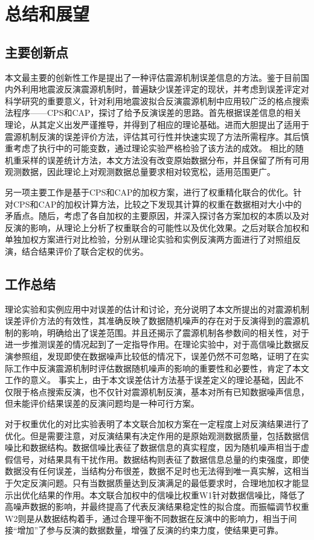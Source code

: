 

\chapter{总结和展望}
\section{主要创新点}
本文最主要的创新性工作是提出了一种评估震源机制误差信息的方法。鉴于目前国内外利用地震波反演震源机制时，普遍缺少误差评定的现状，并考虑到误差评定对科学研究的重要意义，针对利用地震波拟合反演震源机制中应用较广泛的格点搜索法程序——CPS和CAP，探讨了给予反演误差的思路。首先根据误差信息的相关理论，从其定义出发严谨推导，并得到了相应的理论基础。进而大胆提出了适用于震源机制反演的误差评价方法，评估其可行性并快速实现了方法所需程序。其后慎重考虑了执行中的可能变数，通过理论实验严格检验了该方法的成效。
相比的随机重采样的误差统计方法，本文方法没有改变原始数据分布，并且保留了所有可用观测数据，因此理论上对观测数据总量要求相对较宽松，适用范围更广。

另一项主要工作是基于CPS和CAP的加权方案，进行了权重精化联合的优化。针对CPS和CAP的加权计算方法，比较之下发现其计算的权重在数据相对大小中的矛盾点。随后，考虑了各自加权的主要原因，并深入探讨各方案加权的本质以及对反演的影响，从理论上分析了权重联合的可能性以及优化效果。之后对联合加权和单独加权方案进行对比检验，分别从理论实验和实例反演两方面进行了对照组反演，结合结果评价了联合定权的优劣。
\section{工作总结}
理论实验和实例应用中对误差的估计和讨论，充分说明了本文所提出的对震源机制误差评价方法的有效性，其准确反映了数据随机噪声的存在对于反演得到的震源机制的影响，明确给出了误差范围。并且还揭示了震源机制各参数间的相关性，对于进一步推测误差的情况起到了一定指导作用。在理论实验中，对于高信噪比数据反演参照组，发现即使在数据噪声比较低的情况下，误差仍然不可忽略，证明了在实际工作中反演震源机制时评估数据随机噪声的影响的重要性和必要性，肯定了本文工作的意义。
事实上，由于本文误差估计方法基于误差定义的理论基础，因此不仅限于格点搜索反演，也不仅针对震源机制反演，基本对所有已知数据噪声信息，但未能评价结果误差的反演问题均是一种可行方案。

对于权重优化的对比实验表明了本文联合加权方案在一定程度上对反演结果进行了优化。但是需要注意，对反演结果有决定作用的是原始观测数据质量，包括数据信噪比和数据结构。数据信噪比表征了数据信息的真实程度，因为随机噪声相当于虚假信号，对结果具有干扰作用。数据结构则表征了数据信息总量的约束强度，即使数据没有任何误差，当结构分布很差，数据不足时也无法得到唯一真实解，这相当于欠定反演问题。只有当数据质量达到反演满足的最低要求时，合理地加权才能显示出优化结果的作用。本文联合加权中的信噪比权重W1针对数据信噪比，降低了高噪声数据的影响，并最终提高了代表反演结果稳定性的拟合度。而振幅调节权重W2则是从数据结构着手，通过合理平衡不同数据在反演中的影响力，相当于间接“增加”了参与反演的数据数量，增强了反演的约束力度，使结果更可靠。

